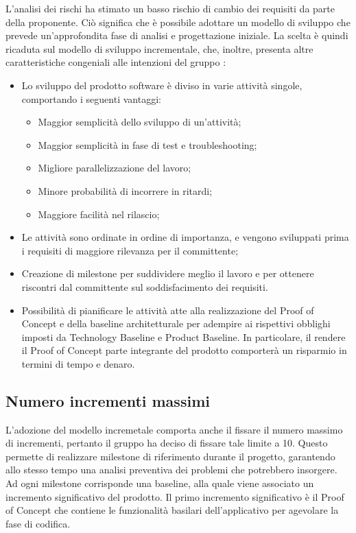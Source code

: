 L'analisi dei rischi ha stimato un basso rischio di cambio dei requisiti da parte della proponente.
Ciò significa che è possibile adottare un modello di sviluppo che prevede un'approfondita fase di 
analisi e progettazione iniziale.
La scelta è quindi ricaduta sul modello di sviluppo incrementale, che, inoltre, presenta altre
caratteristiche congeniali alle intenzioni del gruppo \gruppo \space :
\begin{itemize}
    \item Lo sviluppo del prodotto software è diviso in varie attività singole, comportando i seguenti vantaggi:
    \begin{itemize}
    	\item Maggior semplicità dello sviluppo di un'attività;
    	\item Maggior semplicità in fase di test e {troubleshooting};
    	\item Migliore parallelizzazione del lavoro;
    	\item Minore probabilità di incorrere in ritardi;
    	\item Maggiore facilità nel rilascio;
    \end{itemize}
    \item Le attività sono ordinate in ordine di importanza, e vengono sviluppati prima i requisiti di maggiore rilevanza per il committente;
    \item Creazione di milestone per suddividere meglio il lavoro e per ottenere riscontri dal committente sul soddisfacimento dei requisiti.
    \item Possibilità di pianificare le attività atte alla realizzazione del {Proof of Concept} e della baseline architetturale per adempire ai rispettivi obblighi imposti da Technology Baseline e Product Baseline. In particolare, il rendere il Proof of Concept parte integrante del prodotto comporterà un risparmio in termini di tempo e denaro.
\end{itemize}

\subsection{Numero incrementi massimi}
L'adozione del modello incremetale comporta anche il fissare il numero massimo di incrementi, pertanto il gruppo ha deciso di fissare tale limite a 10. Questo permette di realizzare {milestone} di riferimento durante il progetto, garantendo allo stesso tempo una analisi preventiva dei problemi che potrebbero insorgere. Ad ogni milestone corrisponde una baseline, alla quale viene associato un incremento significativo del prodotto. Il primo incremento significativo è il {Proof of Concept} che contiene le funzionalità basilari dell'applicativo per agevolare la fase di codifica.